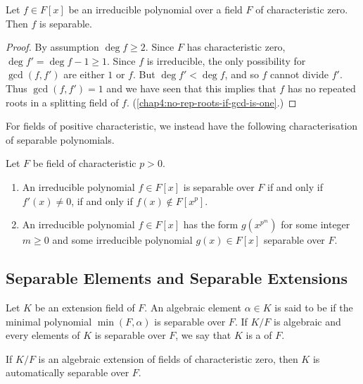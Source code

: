 \begin{lemma}\label{chap4:irreducible-polynomial-char-zero-is-separable}
	Let $f \in F[x]$ be an irreducible polynomial over a field $F$ of characteristic zero. Then $f$ is separable.	
\end{lemma}
\begin{proof}
	By assumption $\deg f \geq 2$. Since $F$ has characteristic zero, $\deg f' = \deg f - 1 \geq 1$. Since $f$ is irreducible, the only possibility for $\gcd(f, f')$ are either $1$ or $f$. But $\deg f' < \deg f$, and so $f$ cannot divide $f'$. Thus $\gcd(f, f') = 1$ and we have seen that this implies that $f$ has no repeated roots in a splitting field of $f$. (\cref{chap4:no-rep-roots-if-gcd-is-one}.)
\end{proof}

For fields of positive characteristic, we instead have the following characterisation of separable polynomials.

\begin{lemma}
	Let $F$ be  field of characteristic $p > 0$. 
	\begin{enumerate}
		\item An irreducible polynomial $f \in F[x]$ is separable over $F$ if and only if $f'(x) \neq 0$, if and only if $f(x) \notin F[x^p]$.
		
		\item An irreducible polynomial $f \in F[x]$ has the form $g(x^{p^m})$ for some integer $m \geq 0$ and some irreducible polynomial $g(x) \in F[x]$ separable over $F$.
	\end{enumerate}
\end{lemma}

\subsection*{Separable Elements and Separable Extensions}

\begin{definition}
	Let $K$ be an extension field of $F$. An algebraic element $\alpha \in K$ is said to be  if the minimal polynomial $\min(F, \alpha)$ is separable over $F$. If $K/F$ is algebraic and every elements of $K$ is separable over $F$, we say that $K$ is a  of $F$.
\end{definition}

\begin{remark}
	If $K/F$ is an algebraic extension of fields of characteristic zero, then $K$ is automatically separable over $F$.
\end{remark}

